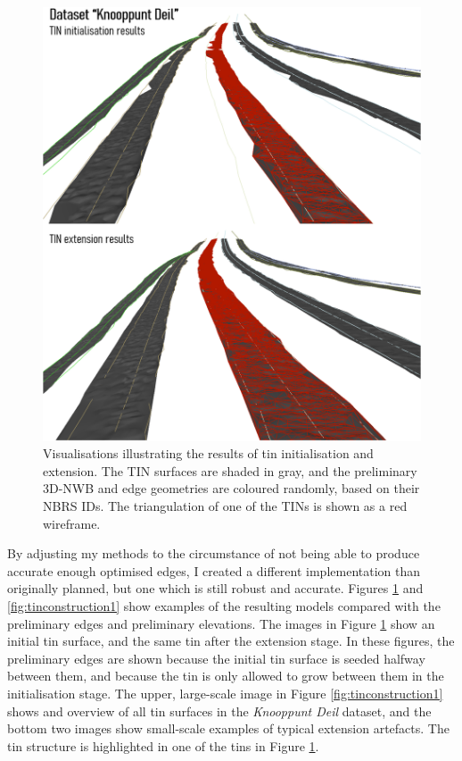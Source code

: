 \begin{figure}
    \centering
    \includegraphics[width=\linewidth]{final_report/figs/tinconstruction0.png}
    \caption[Renders illustrating the results of TIN initialisation and extension]{Visualisations illustrating the results of \ac{tin} initialisation and extension. The TIN surfaces are shaded in gray, and the preliminary 3D-NWB and edge geometries are coloured randomly, based on their NBRS IDs. The triangulation of one of the TINs is shown as a red wireframe.}
    \label{fig:tinconstruction0}
\end{figure}

By adjusting my methods to the circumstance of not being able to produce accurate enough optimised edges, I created a different implementation than originally planned, but one which is still robust and accurate. Figures \ref{fig:tinconstruction0} and \ref{fig:tinconstruction1} show examples of the resulting models compared with the preliminary edges and preliminary elevations. The images in Figure \ref{fig:tinconstruction0} show an initial \ac{tin} surface, and the same \ac{tin} after the extension stage. In these figures, the preliminary edges are shown because the initial \ac{tin} surface is seeded halfway between them, and because the \ac{tin} is only allowed to grow between them in the initialisation stage. The upper, large-scale image in Figure \ref{fig:tinconstruction1} shows and overview of all \ac{tin} surfaces in the \textit{Knooppunt Deil} dataset, and the bottom two images show small-scale examples of typical extension artefacts. The \ac{tin} structure is highlighted in one of the \ac{tin}s in Figure \ref{fig:tinconstruction0}.

